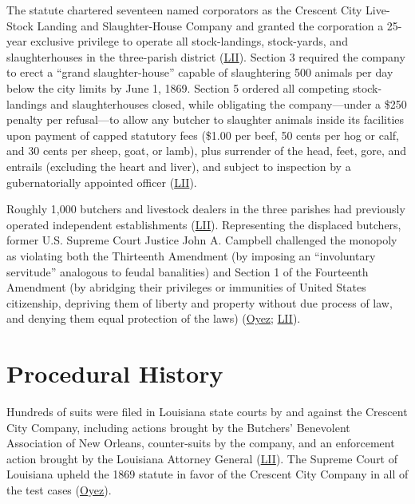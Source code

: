 \documentclass[12pt]{article}
\begin{document}
The statute chartered seventeen named corporators as the Crescent City Live-Stock Landing and Slaughter-House Company and granted the corporation a 25-year exclusive privilege to operate all stock-landings, stock-yards, and slaughterhouses in the three-parish district (\href{https://www.law.cornell.edu/supremecourt/text/83/36}{LII}). Section 3 required the company to erect a ``grand slaughter-house'' capable of slaughtering 500 animals per day below the city limits by June 1, 1869. Section 5 ordered all competing stock-landings and slaughterhouses closed, while obligating the company---under a \$250 penalty per refusal---to allow any butcher to slaughter animals inside its facilities upon payment of capped statutory fees (\$1.00 per beef, 50 cents per hog or calf, and 30 cents per sheep, goat, or lamb), plus surrender of the head, feet, gore, and entrails (excluding the heart and liver), and subject to inspection by a gubernatorially appointed officer (\href{https://www.law.cornell.edu/supremecourt/text/83/36}{LII}).

Roughly 1,000 butchers and livestock dealers in the three parishes had previously operated independent establishments (\href{https://www.law.cornell.edu/supremecourt/text/83/36}{LII}). Representing the displaced butchers, former U.S. Supreme Court Justice John A. Campbell challenged the monopoly as violating both the Thirteenth Amendment (by imposing an ``involuntary servitude'' analogous to feudal banalities) and Section 1 of the Fourteenth Amendment (by abridging their privileges or immunities of United States citizenship, depriving them of liberty and property without due process of law, and denying them equal protection of the laws) (\href{https://www.oyez.org/cases/1850-1900/83us36}{Oyez}; \href{https://www.law.cornell.edu/supremecourt/text/83/36}{LII}).

\section{Procedural History}

Hundreds of suits were filed in Louisiana state courts by and against the Crescent City Company, including actions brought by the Butchers' Benevolent Association of New Orleans, counter-suits by the company, and an enforcement action brought by the Louisiana Attorney General (\href{https://www.law.cornell.edu/supremecourt/text/83/36}{LII}). The Supreme Court of Louisiana upheld the 1869 statute in favor of the Crescent City Company in all of the test cases (\href{https://www.oyez.org/cases/1850-1900/83us36}{Oyez}).
\end{document}

